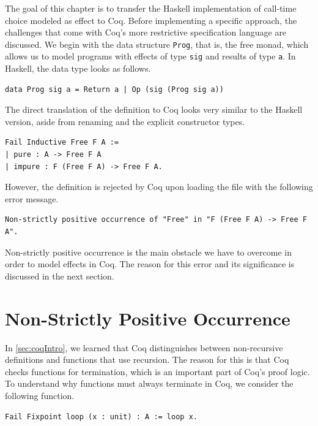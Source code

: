 \documentclass[a4paper, 11pt, fleqn, twoside]{scrreprt}
\newcommand{\hinl}[1]{\texttt{#1}}
\begin{document}
The goal of this chapter is to transfer the Haskell implementation of call-time choice modeled as effect to Coq.
Before implementing a specific approach, the challenges that come with Coq's more restrictive specification language are discussed.
We begin with the data structure \hinl{Prog}, that is, the free monad, which allows us to model programs with effects of type \hinl{sig} and results of type \hinl{a}.
In Haskell, the data type looks as follows.

\begin{verbatim}
data Prog sig a = Return a | Op (sig (Prog sig a))
\end{verbatim}

The direct translation of the definition to Coq looks very similar to the Haskell version, aside from renaming and the explicit constructor types.

\begin{verbatim}
Fail Inductive Free F A :=
| pure : A -> Free F A
| impure : F (Free F A) -> Free F A.
\end{verbatim}

However, the definition is rejected by Coq upon loading the file with the following error message.

\begin{verbatim}
Non-strictly positive occurrence of "Free" in "F (Free F A) -> Free F A".
\end{verbatim}

Non-strictly positive occurrence is the main obstacle we have to overcome in order to model effects in Coq.
The reason for this error and its significance is discussed in the next section.

\section{Non-Strictly Positive Occurrence}
\label{sec:non-strictly}

In \autoref{sec:coqIntro}, we learned that Coq distinguishes between non-recursive definitions and functions that use recursion.
The reason for this is that Coq checks functions for termination, which is an important part of Coq's proof logic.
To understand why functions must always terminate in Coq, we consider the following function.

\begin{verbatim}
Fail Fixpoint loop (x : unit) : A := loop x.
\end{verbatim}
\end{document}
